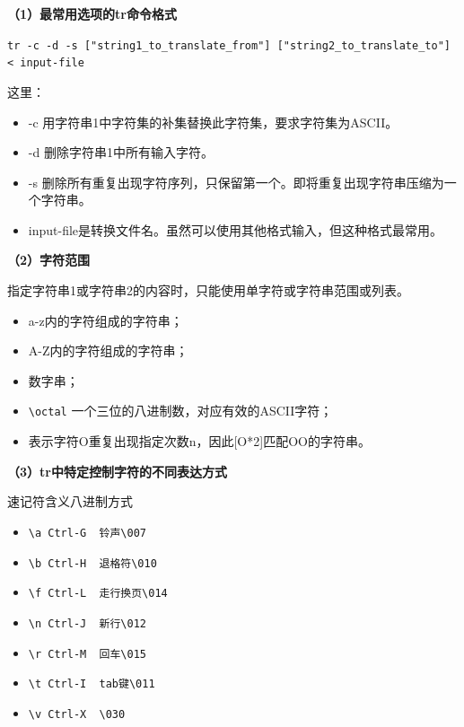 \textbf{（1）最常用选项的tr命令格式}

\verb|tr -c -d -s ["string1_to_translate_from"] ["string2_to_translate_to"] < input-file|

这里：
\begin{itemize}
\item -c 用字符串1中字符集的补集替换此字符集，要求字符集为ASCII。
\item -d 删除字符串1中所有输入字符。
\item -s 删除所有重复出现字符序列，只保留第一个。即将重复出现字符串压缩为一个字符串。
\item input-file是转换文件名。虽然可以使用其他格式输入，但这种格式最常用。
\end{itemize}

\textbf{（2）字符范围}

指定字符串1或字符串2的内容时，只能使用单字符或字符串范围或列表。
\begin{itemize}
\item [a-z] a-z内的字符组成的字符串；
\item [A-Z] A-Z内的字符组成的字符串；
\item [0-9] 数字串；
\item \verb|\octal| 一个三位的八进制数，对应有效的ASCII字符；
\item [O*n] 表示字符O重复出现指定次数n，因此[O*2]匹配OO的字符串。
\end{itemize}

\textbf{（3）tr中特定控制字符的不同表达方式}

速记符含义八进制方式
\begin{itemize}
\item \verb|\a Ctrl-G  铃声\007|
\item \verb|\b Ctrl-H  退格符\010|
\item \verb|\f Ctrl-L  走行换页\014|
\item \verb|\n Ctrl-J  新行\012|
\item \verb|\r Ctrl-M  回车\015|
\item \verb|\t Ctrl-I  tab键\011|
\item \verb|\v Ctrl-X  \030|
\end{itemize}


